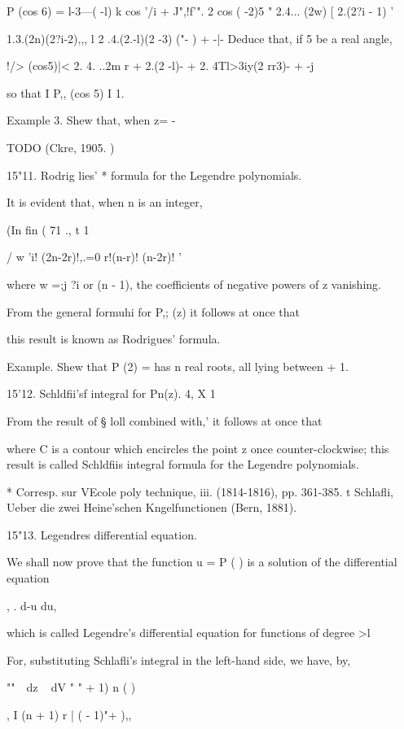 P (cos 6) = l-3---( -l) k cos '/i + J",!f'". 2 cos ( -2)5 " 2.4...
(2w) [ 2.(2?i - 1) '

1.3.(2n)(2?i-2),,, l 2 .4.(2.-l)(2 -3) ("- ) + -|- Deduce that, if 5
be a real angle,

!/> (cos5)|< 2. 4. ..2m r + 2.(2 -l)- + 2. 4Tl>3iy(2 rr3)- + -j

so that I P,, (cos 5) I 1. 

Example 3. Shew that, when z= -\,

TODO
(Ckre, 1905. )

15"11. Rodrig lies' * formula for the Legendre polynomials.

It is evident that, when n is an integer,

(In fin ( 71 ., t 1

  / w 'i! (2n-2r)!,.=0 r!(n-r)! (n-2r)! '

where w =;j ?i or (n - 1), the coefficients of negative powers of z
vanishing.

From the general formuhi for P,; (z) it follows at once that

this result is known as Rodrigues' formula.

Example. Shew that P (2) = has n real roots, all lying between + 1.

15'12. Schldfii'sf integral for Pn(z). 4, X 1

From the result of § loll combined with,' it follows at once
that

where C is a contour which encircles the point z once
counter-clockwise; this result is called Schldfiis integral formula
for the Legendre polynomials.

* Corresp. sur VEcole poly technique, iii. (1814-1816), pp. 361-385. t
Schlafli, Ueber die zwei Heine'schen Kngelfunctionen (Bern, 1881).

%
%

15"13. Legendres differential equation.

We shall now prove that the function u = P ( ) is a solution of the
differential equation

, . d-u du,

which is called Legendre's differential equation for functions of
degree >l

For, substituting Schlafli's integral in the left-hand side, we have,
by,

  ""~~dz ~ dV " " + 1) n ( )

, I (n + 1) r | ( - 1)"+ ),,


